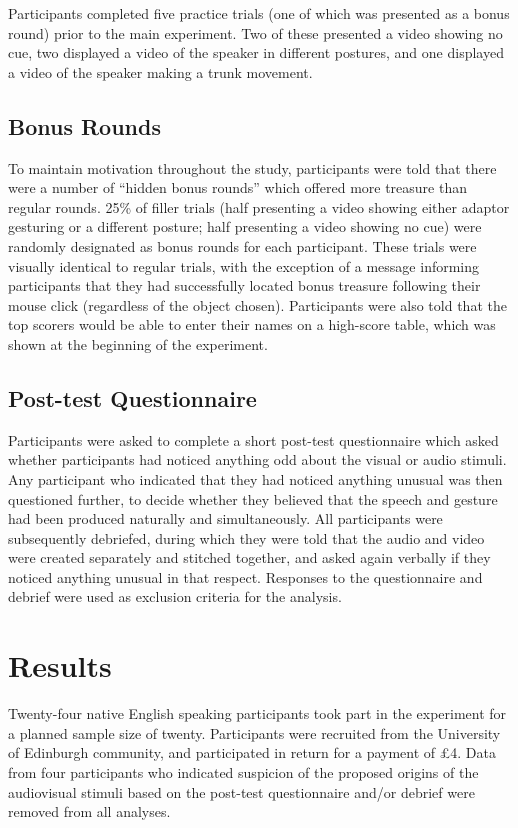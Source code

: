\documentclass[a4paper,man,natbib]{apa6}
\begin{document}
Participants completed five practice trials (one of which was presented as a bonus round) prior to the main experiment. 
Two of these presented a video showing no cue, two displayed a video of the speaker in different postures, and one displayed a video of the speaker making a trunk movement.

\subsection{Bonus Rounds}
To maintain motivation throughout the study, participants were told that there were a number of ``hidden bonus rounds'' which offered more treasure than regular rounds.
25\% of filler trials (half presenting a video showing either adaptor gesturing or a different posture; half presenting a video showing no cue) were randomly designated as bonus rounds for each participant.
These trials were visually identical to regular trials, with the exception of a message informing participants that they had successfully located bonus treasure following their mouse click (regardless of the object chosen).
Participants were also told that the top scorers would be able to enter their names on a high-score table, which was shown at the beginning of the experiment. 

\subsection{Post-test Questionnaire}
Participants were asked to complete a short post-test questionnaire which asked whether participants had noticed anything odd about the visual or audio stimuli.
Any participant who indicated that they had noticed anything unusual was then questioned further, to decide whether they believed that the speech and gesture had been produced naturally and simultaneously.
All participants were subsequently debriefed, during which they were told that the audio and video were created separately and stitched together, and asked again verbally if they noticed anything unusual in that respect. 
Responses to the questionnaire and debrief were used as exclusion criteria for the analysis.

\section{Results}
Twenty-four native English speaking participants took part in the experiment for a planned sample size of twenty.
Participants were recruited from the University of Edinburgh community, and participated in return for a payment of \pounds{}4.
Data from four participants who indicated suspicion of the proposed origins of the audiovisual stimuli based on the post-test questionnaire and/or debrief were removed from all analyses.
\end{document}
